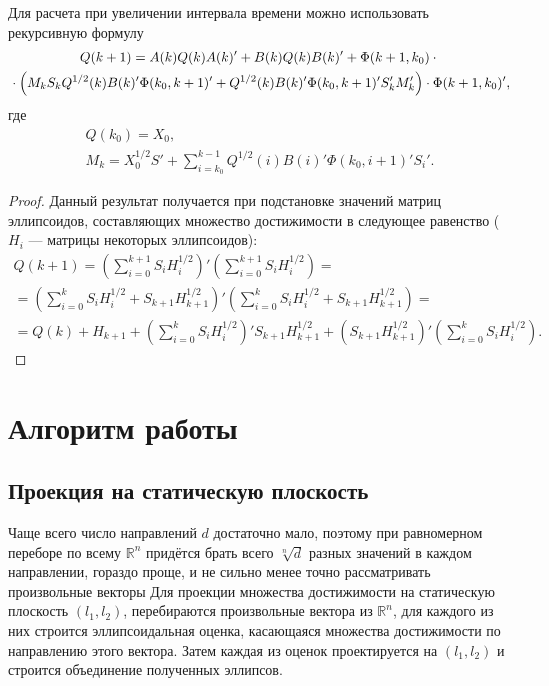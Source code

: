 \documentclass[10pt, a4paper]{article}
\begin{document}
\begin{theorem}
Для расчета при увеличении интервала времени можно использовать рекурсивную формулу
	\begin{gather}
		\notag Q(k+1) = A(k)Q(k)A(k)' + B(k)Q(k)B(k)' + \Phi(k+1,k_0)\cdot {}\\
		\label{recurrent_good}
		{} \cdot \left( M_k S_k Q^{1/2}(k)B(k)'\Phi(k_0,k+1)' + Q^{1/2}(k)B(k)'\Phi(k_0,k+1)'S_k'M_k' \right) \cdot \Phi(k+1,k_0)',
	\end{gather}
	где
	\begin{gather}
		Q(k_0) = X_0,\\
		M_k = X_0^{1/2}S'+\sum\limits_{i=k_0}^{k-1}Q^{1/2}(i)B(i)'\Phi(k_0,i+1)'S_i'.
	\end{gather}
\end{theorem}
\begin{proof}
Данный результат получается при подстановке значений матриц эллипсоидов, составляющих множество достижимости в следующее равенство ($H_i$ --- матрицы некоторых эллипсоидов):
\begin{gather}
	Q(k+1) = \left(\sum\limits_{i=0}^{k+1}S_iH_i^{1/2}\right)'\left(\sum\limits_{i=0}^{k+1}S_iH_i^{1/2}\right) = \\
	= \left(\sum\limits_{i=0}^{k}S_iH_i^{1/2} + S_{k+1}H_{k+1}^{1/2} \right)'\left(\sum\limits_{i=0}^{k}S_iH_i^{1/2} + S_{k+1}H_{k+1}^{1/2}\right) = \\
	= Q(k) + H_{k+1} + \left(\sum\limits_{i=0}^{k}S_iH_i^{1/2}\right)' S_{k+1}H_{k+1}^{1/2} +
	\left(  S_{k+1}H_{k+1}^{1/2} \right)'\left(\sum\limits_{i=0}^{k}S_iH_i^{1/2}\right).
\end{gather}
\end{proof}

\section{Алгоритм работы}
\subsection{Проекция на статическую плоскость}
Чаще всего число направлений $d$ достаточно мало, поэтому при равномерном переборе по всему $\mathbb{R}^n$ придётся брать всего $\sqrt[n]{d}$ разных значений в каждом направлении, гораздо проще, и не сильно менее точно рассматривать произвольные векторы
Для проекции множества достижимости на статическую плоскость $(l_1,l_2)$, перебираются произвольные вектора из $\mathbb{R}^n$, для каждого из них строится эллипсоидальная оценка, касающаяся множества достижимости по направлению этого вектора. Затем каждая из оценок проектируется на $(l_1,l_2)$ и строится объединение полученных эллипсов.
\end{document}

